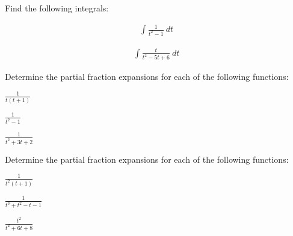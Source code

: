 

\begin{problem}
\item Find the following integrals:

  \begin{subproblem}
  \item 
    \begin{eqnarray*}
      \int \frac{1}{t^2-1} ~ dt 
    \end{eqnarray*}
    \vfill

  \item 
    \begin{eqnarray*}
      \int \frac{t}{t^2-5t+6} ~ dt
    \end{eqnarray*}
    \vfill

  \end{subproblem}
\end{problem}


\begin{problem}
\item Determine the partial fraction expansions for each of the following functions:

  \begin{subproblem}
  \item $\frac{1}{t(t+1)}$
    \vfill
  \item $\frac{1}{t^2-1}$
    \vfill
  \item $\frac{1}{t^2+3t+2}$
    \vfill
  \end{subproblem}


  \clearpage
\item Determine the partial fraction expansions for each of the following functions:

  \begin{subproblem}
  \item $\frac{1}{t^2(t+1)}$
    \vfill
  \item $\frac{1}{t^3+t^2-t-1}$
    \vfill
  \item $\frac{t^2}{t^2+6t+8}$
    \vfill
  \end{subproblem}


\end{problem}


